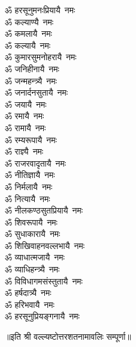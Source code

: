 \begin{flushleft}
\begin{multicols}{2}
ॐ हरसूनुमनःप्रियायै~नमः\\
ॐ कल्याण्यै~नमः\\
ॐ कमलायै~नमः\\
ॐ कल्यायै~नमः\\
ॐ कुमारसुमनोहरायै~नमः\\
ॐ जनिहीनायै~नमः\\
ॐ जन्महन्त्र्यै~नमः\\
ॐ जनार्दनसुतायै~नमः\\
ॐ जयायै~नमः\hfill{}\\
ॐ रमायै~नमः\\
ॐ रामायै~नमः\\
ॐ रम्यरूपायै~नमः\\
ॐ राज्ञ्यै~नमः\\
ॐ राजरवादृतायै~नमः\\
ॐ नीतिज्ञायै~नमः\\
ॐ निर्मलायै~नमः\\
ॐ नित्यायै~नमः\\
ॐ नीलकण्ठसुतप्रियायै~नमः\\
ॐ शिवरूपायै~नमः\hfill{}\\
ॐ सुधाकारायै~नमः\\
ॐ शिखिवाहनवल्लभायै~नमः\\
ॐ व्याधात्मजायै~नमः\\
ॐ व्याधिहन्त्र्यै~नमः\\
ॐ विविधागमसंस्तुतायै~नमः\\
ॐ हर्षदात्र्यै~नमः\\
ॐ हरिभवायै~नमः\\
ॐ हरसूनुप्रियङ्गनायै~नमः\\
\end{multicols}
\end{flushleft}
॥इति श्री वल्ल्यष्टोत्तरशतनामावलिः सम्पूर्णा॥
